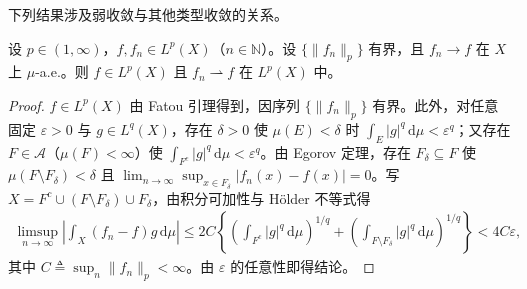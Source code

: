 \documentclass[../../main.tex]{subfiles}%
\begin{document}
下列结果涉及弱收敛与其他类型收敛的关系。

\begin{proposition}\label{proposition:ch02-有界a.e.弱收敛}
设 $p\in(1,\infty)$，$f,f_n\in L^p(X)$（$n\in\mathbb N$）。设 $\{\|f_n\|_p\}$ 有界，且 $f_n\to f$ 在 $X$ 上 $\mu$-a.e.。则 $f\in L^p(X)$ 且 $f_n\rightharpoonup f$ 在 $L^p(X)$ 中。
\end{proposition}

\begin{proof}
$f\in L^p(X)$ 由 Fatou 引理得到，因序列 $\{\|f_n\|_p\}$ 有界。此外，对任意固定 $\varepsilon>0$ 与 $g\in L^q(X)$，存在 $\delta>0$ 使 $\mu(E)<\delta$ 时 $\int_E|g|^q\,\mathrm{d}\mu<\varepsilon^q$；又存在 $F\in\mathscr A$（$\mu(F)<\infty$）使 $\int_{F^c}|g|^q\,\mathrm{d}\mu<\varepsilon^q$。由 Egorov 定理，存在 $F_\delta\subseteq F$ 使 $\mu(F\setminus F_\delta)<\delta$ 且 $\lim_{n\to\infty}\sup_{x\in F_\delta}|f_n(x)-f(x)|=0$。写 $X=F^c\cup(F\setminus F_\delta)\cup F_\delta$，由积分可加性与 H\"older 不等式得
\begin{align*}
\limsup_{n\to\infty}\left|\int_X(f_n-f)g\,\mathrm{d}\mu\right|
\leqslant 2C\left\{\left(\int_{F^c}|g|^q\,\mathrm{d}\mu\right)^{1/q}
+\left(\int_{F\setminus F_\delta}|g|^q\,\mathrm{d}\mu\right)^{1/q}\right\}<4C\varepsilon,
\end{align*}
其中 $C\triangleq \sup_n\|f_n\|_p<\infty$。由 $\varepsilon$ 的任意性即得结论。
\end{proof}
\end{document}
